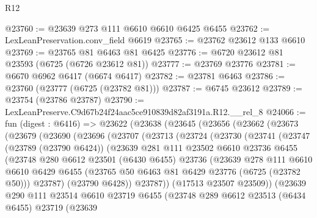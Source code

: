 \begin{lexlean}{R12}
\begin{coremodule}
@23760 := @23639 @273 @111 @6610 @6610 @6425 @6455
@23762 := LexLeanPreservation.conv_field @6619
@23765 := @23762 @23612 @133 @6610
@23769 := @23765 @81 @6463 @81 @6425
@23776 := @6720 @23612 @81 @23593 (@6725 (@6726 @23612 @81))
@23777 := @23769 @23776
@23781 := @6670 @6962 @6417 (@6674 @6417)
@23782 := @23781 @6463
@23786 := @23760 (@23777 (@6725 (@23782 @81)))
@23787 := @6745 @23612
@23789 := @23754 (@23786 @23787)
@23790 := LexLeanPreserve.C9d67b24f24aac5ce910839d82af3191a.R12.__rel_8
@24066 := fun (digest : @6416) =>
  @23622
    (@23638
      (@23645
        (@23656
          (@23662
            (@23673
              (@23679
                (@23690
                  (@23696
                    (@23707
                      (@23713
                        (@23724
                          (@23730
                            (@23741
                              (@23747
                                (@23789 (@23790 @6424))
                                (@23639
                                  @281
                                  @111
                                  @23502
                                  @6610
                                  @23736
                                  @6455
                                  (@23748
                                    @280
                                    @6612
                                    @23501
                                    (@6430 @6455)
                                    @23736
                                    (@23639
                                      @278
                                      @111
                                      @6610
                                      @6610
                                      @6429
                                      @6455
                                      (@23765 @50 @6463 @81 @6429 @23776 (@6725 (@23782 @50)))
                                      @23787)
                                    (@23790 @6428))
                                  @23787))
                              (@17513 @23507 @23509))
                            (@23639
                              @290
                              @111
                              @23514
                              @6610
                              @23719
                              @6455
                              (@23748
                                @289
                                @6612
                                @23513
                                (@6434 @6455)
                                @23719
                                (@23639

\end{coremodule}
\end{lexlean}
